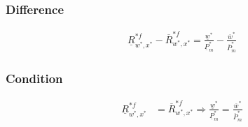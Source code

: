 \subsubsection*{Difference}
\begin{equation}\label{proxweu.diff}  
\begin{aligned}
\underline R^{*f}_{w^*, x^*} - \overline R^{*f}_{w^*, x^*} = \frac{\underline w^*}{\underline P^*_{m}} - \frac{\overline w^*}{\overline P^*_{m}}
\end{aligned}  
\end{equation}

\subsubsection*{Condition}
\begin{equation}\label{proxweu.con}  
\begin{aligned}
    \underline R^{*f}_{w^*, x^*} &= \overline R^{*f}_{w^*, x^*} \Rightarrow \frac{\underline w^*}{\underline P^*_{m}} = \frac{\overline w^*}{\overline P^*_{m}}
\end{aligned}  
\end{equation}

